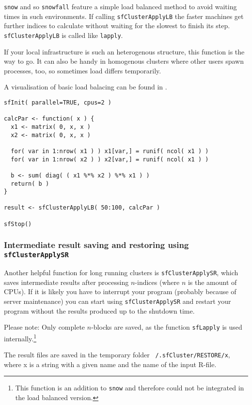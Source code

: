 \documentclass[10pt,oneside]{article}
\begin{document}
\texttt{snow} and so \texttt{snowfall} feature a simple load balanced method
to avoid waiting times in such environments. If calling
\texttt{sfClusterApplyLB} the faster machines get further indices to
calculate without waiting for the slowest to finish its step.
\texttt{sfClusterApplyLB} is called like \texttt{lapply}.

If your local infrastructure is such an heterogenous structure, this
function is the way to go. It can also be handy in homogenous clusters
where other users spawn processes, too, so sometimes load differs
temporarily.

A visualisation of basic load balacing can be found in \cite{ROSS_07}.

\begin{verbatim}
sfInit( parallel=TRUE, cpus=2 )

calcPar <- function( x ) {
  x1 <- matrix( 0, x, x )
  x2 <- matrix( 0, x, x )

  for( var in 1:nrow( x1 ) ) x1[var,] = runif( ncol( x1 ) )
  for( var in 1:nrow( x2 ) ) x2[var,] = runif( ncol( x1 ) )

  b <- sum( diag( ( x1 %*% x2 ) %*% x1 ) )
  return( b )
}

result <- sfClusterApplyLB( 50:100, calcPar )

sfStop()
\end{verbatim}

\subsubsection{Intermediate result saving and restoring using
               \texttt{sfClusterApplySR}}
Another helpful function for long running clusters is
\texttt{sfClusterApplySR}, which saves intermediate results after
processing $n$-indices (where $n$ is the amount of CPUs). If it is likely
you have to interrupt your program (probably because of server
maintenance) you can start using \texttt{sfClusterApplySR} and restart
your program without the results produced up to the shutdown time.

Please note: Only complete $n$-blocks are saved, as the
function \texttt{sfLapply} is used internally.\footnote{This function is an addition
to \texttt{snow} and therefore could not be integrated in the load
balanced version.}

The result files are saved in the temporary folder
\texttt{~/.sfCluster/RESTORE/x}, where x is a string with a given name
and the name of the input R-file.
\end{document}
